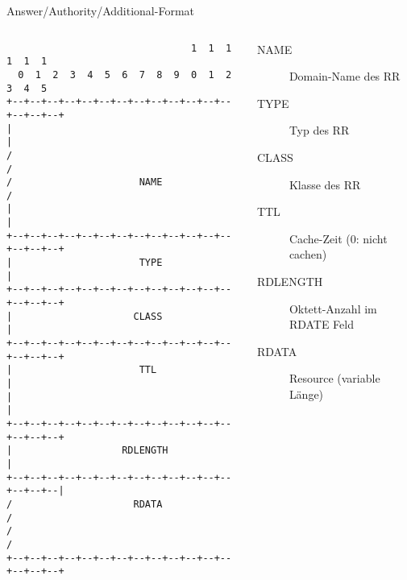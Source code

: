\documentclass{beamer}
\begin{document}
  \begin{frame}[fragile]{\mytitle}{Answer/Authority/Additional-Format}
    \begin{columns}[c]
      \column{5cm}
      \tiny{
        \begin{verbatim}
                                1  1  1  1  1  1
  0  1  2  3  4  5  6  7  8  9  0  1  2  3  4  5
+--+--+--+--+--+--+--+--+--+--+--+--+--+--+--+--+
|                                               |
/                                               /
/                      NAME                     /
|                                               |
+--+--+--+--+--+--+--+--+--+--+--+--+--+--+--+--+
|                      TYPE                     |
+--+--+--+--+--+--+--+--+--+--+--+--+--+--+--+--+
|                     CLASS                     |
+--+--+--+--+--+--+--+--+--+--+--+--+--+--+--+--+
|                      TTL                      |
|                                               |
+--+--+--+--+--+--+--+--+--+--+--+--+--+--+--+--+
|                   RDLENGTH                    |
+--+--+--+--+--+--+--+--+--+--+--+--+--+--+--+--|
/                     RDATA                     /
/                                               /
+--+--+--+--+--+--+--+--+--+--+--+--+--+--+--+--+
        \end{verbatim}
      }
      \column{7cm}
        \footnotesize{
       \begin{description}
          \item[NAME] Domain-Name des RR
          \item[TYPE] Typ des RR
          \item[CLASS] Klasse des RR
          \item[TTL] Cache-Zeit (0: nicht cachen)
          \item[RDLENGTH] Oktett-Anzahl im RDATE Feld
          \item[RDATA] Resource (variable Länge)
        \end{description}
      }
    \end{columns}
\end{frame}
\end{document}
